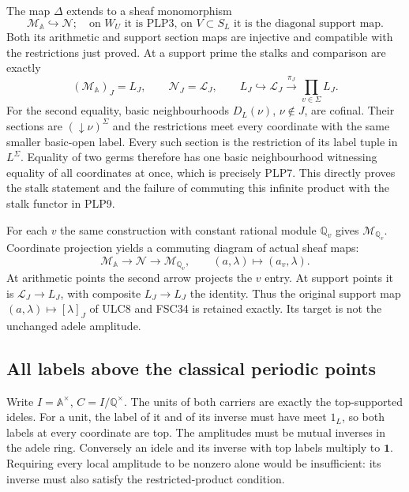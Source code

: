 The map $\Delta$ extends to a sheaf monomorphism
\begin{equation}\tag{PLP12}
\mathcal M_{\mathbb A}\hookrightarrow\mathcal N;
\quad\text{on }W_U\text{ it is PLP3, on }V\subset S_L
\text{ it is the diagonal support map}.
\end{equation}
Both its arithmetic and support section maps are injective and
compatible with the restrictions just proved. At a support prime
the stalks and comparison are exactly
\begin{equation}\tag{PLP13}
(\mathcal M_{\mathbb A})_J=L_J,\qquad
\mathcal N_J=\mathscr L_J,\qquad
L_J\hookrightarrow\mathscr L_J
\xrightarrow{\pi_J}\prod_{v\in\Sigma}L_J .
\end{equation}
For the second equality, basic neighbourhoods $D_L(\nu)$,
$\nu\notin J$, are cofinal. Their sections are
$(\downarrow\nu)^\Sigma$ and the restrictions meet every coordinate
with the same smaller basic-open label. Every such section is the
restriction of its label tuple in $L^\Sigma$. Equality of two germs
therefore has one basic neighbourhood witnessing equality of all
coordinates at once, which is precisely PLP7. This directly proves
the stalk statement and the failure of commuting this infinite
product with the stalk functor in PLP9.

For each $v$ the same construction with constant rational module
$\mathbb Q_v$ gives $\mathcal M_{\mathbb Q_v}$. Coordinate
projection yields a commuting diagram of actual sheaf maps:
\begin{equation}\tag{PLP14}
\mathcal M_{\mathbb A}\longrightarrow\mathcal N
\longrightarrow\mathcal M_{\mathbb Q_v},\qquad
(a,\lambda)\longmapsto(a_v,\lambda).
\end{equation}
At arithmetic points the second arrow projects the $v$ entry. At
support points it is $\mathscr L_J\to L_J$, with composite
$L_J\to L_J$ the identity. Thus the original support map
$(a,\lambda)\mapsto[\lambda]_J$ of ULC8 and FSC34 is retained
exactly. Its target is not the unchanged adele amplitude.

\subsection{All labels above the classical periodic points}

Write $I=\mathbb A^\times$, $C=I/\mathbb Q^\times$. The units of
both carriers are exactly the top-supported ideles. For a unit,
the label of it and of its inverse must have meet $1_L$, so both
labels at every coordinate are top. The amplitudes must be mutual
inverses in the adele ring. Conversely an idele and its inverse
with top labels multiply to $\mathbf{1}$. Requiring every local
amplitude to be nonzero alone would be insufficient: its inverse
must also satisfy the restricted-product condition.

